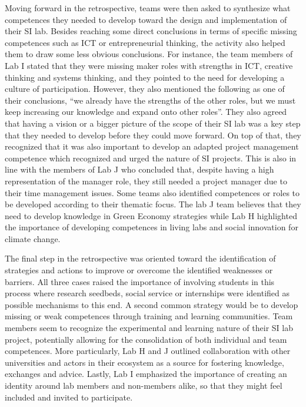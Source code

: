 \documentclass[AMA,STIX1COL,APA,STIX2COL]{WileyNJD-v2}
\begin{document}
Moving forward in the retrospective, teams were then asked to synthesize
what competences they needed to develop toward the design and
implementation of their SI lab. Besides reaching some direct conclusions
in terms of specific missing competences such as ICT or entrepreneurial
thinking, the activity also helped them to draw some less obvious
conclusions. For instance, the team members of Lab I stated that they
were missing maker roles with strengths in ICT, creative thinking and
systems thinking, and they pointed to the need for developing a culture
of participation. However, they also mentioned the following as one of
their conclusions, ``we already have the strengths of the other roles,
but we must keep increasing our knowledge and expand onto other roles''.
They also agreed that having a vision or a bigger picture of the scope
of their SI lab was a key step that they needed to develop before they
could move forward. On top of that, they recognized that it was also
important to develop an adapted project management competence which
recognized and urged the nature of SI projects. This is also in line
with the members of Lab J who concluded that, despite having a high
representation of the manager role, they still needed a project manager
due to their time management issues. Some teams also identified
competences or roles to be developed according to their thematic focus.
The lab J team believes that they need to develop knowledge in Green
Economy strategies while Lab H highlighted the importance of developing
competences in living labs and social innovation for climate change.

The final step in the retrospective was oriented toward the
identification of strategies and actions to improve or overcome the
identified weaknesses or barriers. All three cases raised the importance
of involving students in this process where research seedbeds, social
service or internships were identified as possible mechanisms to this
end. A second common strategy would be to develop missing or weak
competences through training and learning communities. Team members seem
to recognize the experimental and learning nature of their SI lab
project, potentially allowing for the consolidation of both individual
and team competences. More particularly, Lab H and J outlined
collaboration with other universities and actors in their ecosystem as a
source for fostering knowledge, exchanges and advice. Lastly, Lab I
emphasized the importance of creating an identity around lab members and
non-members alike, so that they might feel included and invited to
participate.
\end{document}
